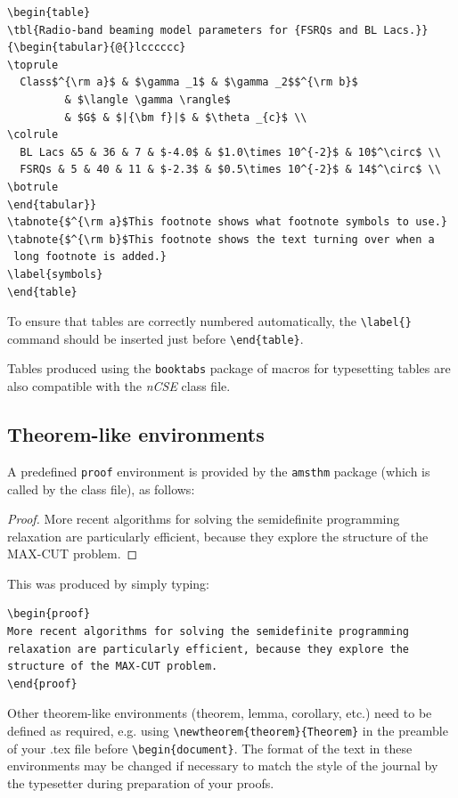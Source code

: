\documentclass{nCSE2e}
\begin{document}
\begin{verbatim}
\begin{table}
\tbl{Radio-band beaming model parameters for {FSRQs and BL Lacs.}}
{\begin{tabular}{@{}lcccccc}
\toprule
  Class$^{\rm a}$ & $\gamma _1$ & $\gamma _2$$^{\rm b}$
         & $\langle \gamma \rangle$
         & $G$ & $|{\bm f}|$ & $\theta _{c}$ \\
\colrule
  BL Lacs &5 & 36 & 7 & $-4.0$ & $1.0\times 10^{-2}$ & 10$^\circ$ \\
  FSRQs & 5 & 40 & 11 & $-2.3$ & $0.5\times 10^{-2}$ & 14$^\circ$ \\
\botrule
\end{tabular}}
\tabnote{$^{\rm a}$This footnote shows what footnote symbols to use.}
\tabnote{$^{\rm b}$This footnote shows the text turning over when a
 long footnote is added.}
\label{symbols}
\end{table}
\end{verbatim}

To ensure that tables are correctly numbered automatically, the
\verb"\label{}" command should be inserted just before
\verb"\end{table}".

Tables produced using the {\tt booktabs} package of macros for typesetting tables are also compatible with the {\it nCSE} class file.


\subsection{Theorem-like environments}

A predefined \verb"proof" environment is provided by the {\tt amsthm} package (which is called by the class file), as follows:

\begin{proof}
More recent algorithms for solving the semidefinite programming relaxation
are particularly efficient, because they explore the structure of the
MAX-CUT problem.
\end{proof}
\noindent This was produced by simply typing:
%
\begin{verbatim}
\begin{proof}
More recent algorithms for solving the semidefinite programming
relaxation are particularly efficient, because they explore the
structure of the MAX-CUT problem.
\end{proof}
\end{verbatim}
%
Other theorem-like environments (theorem, lemma, corollary, etc.) need to be defined as required, e.g. using \verb"\newtheorem{theorem}{Theorem}" in the preamble of your .tex file before \verb"\begin{document}". The format of the text in these environments may be changed if necessary to match the style of the journal by the typesetter during preparation of your proofs.
\end{document}
